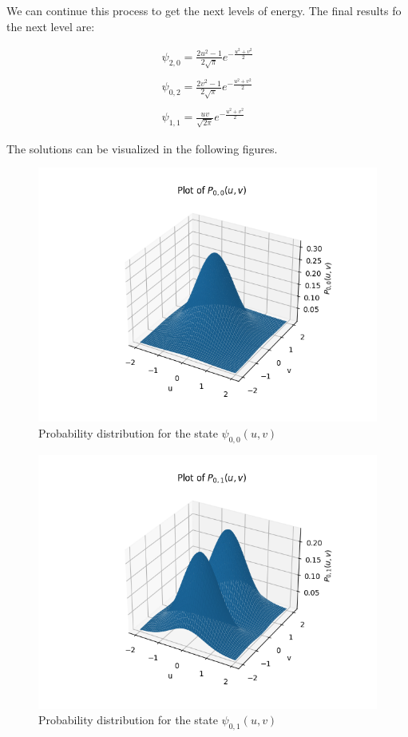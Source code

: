 We can continue this process to get the next levels of energy. The final results fo the next level are:

\begin{equation}
  \begin{array}{c}
    \psi_{2,0} = \frac{2u^2-1}{2\sqrt{\pi}}e^{-\frac{u^2+v^2}{2}}
    \\

    \\
    \psi_{0,2} = \frac{2v^2-1}{2\sqrt{\pi}}e^{-\frac{u^2+v^2}{2}}
    \\

    \\
    \psi_{1,1} = \frac{uv}{\sqrt{2\pi}}e^{-\frac{u^2+v^2}{2}}
  \end{array}
\end{equation}

The solutions can be visualized in the following figures.

\begin{figure}
  \centering
  \includegraphics{images8/P_0,0.png}
  \caption{Probability distribution for the state $\psi_{0,0}(u,v)$}
\end{figure}

\begin{figure}
  \centering
  \includegraphics{images8/P_0,1.png}
  \caption{Probability distribution for the state $\psi_{0,1}(u,v)$}
\end{figure}

